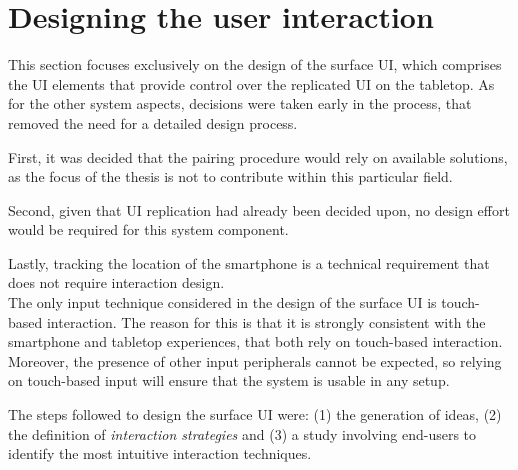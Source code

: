 \section{Designing the user interaction}
\label{sec:interaction}

This section focuses exclusively on the design of the surface UI, which comprises the UI elements that provide control over the replicated UI on the tabletop.
As for the other system aspects, decisions were taken early in the process, that removed the need for a detailed design process.

First, it was decided that the pairing procedure would rely on available solutions, as the focus of the thesis is not to contribute within this particular field.

Second, given that UI replication had already been decided upon, no design effort would be required for this system component.

Lastly, tracking the location of the smartphone is a technical requirement that does not require interaction design. %
\\
\linebreak
The only input technique considered in the design of the surface UI is touch-based interaction.
The reason for this is that it is strongly consistent with the smartphone and tabletop experiences, that both rely on touch-based interaction.
Moreover, the presence of other input peripherals cannot be expected, so relying on touch-based input will ensure that the system is usable in any setup.

The steps followed to design the surface UI were: (1) the generation of ideas, (2) the definition of \emph{interaction strategies} and (3) a study involving end-users to identify the most intuitive interaction techniques.


